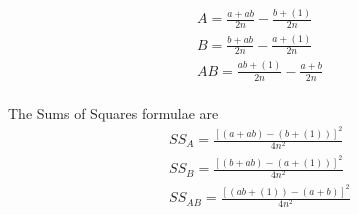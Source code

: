 \begin{eqnarray}
A = \frac{a+ab}{2n} -  \frac{b + (1)}{2n}\\
B = \frac{b+ab}{2n} -  \frac{a + (1)}{2n}\\
AB = \frac{ab + (1)}{2n} -  \frac{a + b}{2n}\\
\end{eqnarray}

The Sums of Squares formulae are
\begin{eqnarray}
SS_{A} = \frac{[(a + ab)-(b + (1))]^2}{4n^2}\\
SS_{B} = \frac{[(b + ab)-(a + (1))]^2}{4n^2}\\
SS_{AB} = \frac{[(ab + (1))-(a + b)]^2}{4n^2}\\
\end{eqnarray}


